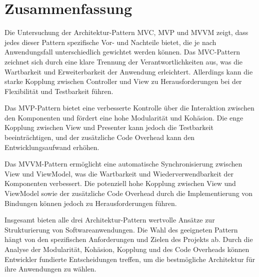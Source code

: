 
\chapter{Zusammenfassung}

Die Untersuchung der Architektur-Pattern \ac{MVC}, \ac{MVP} und \ac{MVVM} zeigt, dass jedes dieser Pattern spezifische Vor- und Nachteile bietet, die je nach Anwendungsfall unterschiedlich gewichtet werden können. Das \ac{MVC}-Pattern zeichnet sich durch eine klare Trennung der Verantwortlichkeiten aus, was die Wartbarkeit und Erweiterbarkeit der Anwendung erleichtert. Allerdings kann die starke Kopplung zwischen Controller und View zu Herausforderungen bei der Flexibilität und Testbarkeit führen.

Das \ac{MVP}-Pattern bietet eine verbesserte Kontrolle über die Interaktion zwischen den Komponenten und fördert eine hohe Modularität und Kohäsion. Die enge Kopplung zwischen View und Presenter kann jedoch die Testbarkeit beeinträchtigen, und der zusätzliche Code Overhead kann den Entwicklungsaufwand erhöhen.

Das \ac{MVVM}-Pattern ermöglicht eine automatische Synchronisierung zwischen View und ViewModel, was die Wartbarkeit und Wiederverwendbarkeit der Komponenten verbessert. Die potenziell hohe Kopplung zwischen View und ViewModel sowie der zusätzliche Code Overhead durch die Implementierung von Bindungen können jedoch zu Herausforderungen führen.

Insgesamt bieten alle drei Architektur-Pattern wertvolle Ansätze zur Strukturierung von Softwareanwendungen. Die Wahl des geeigneten Pattern hängt von den spezifischen Anforderungen und Zielen des Projekts ab. Durch die Analyse der Modularität, Kohäsion, Kopplung und des Code Overheads können Entwickler fundierte Entscheidungen treffen, um die bestmögliche Architektur für ihre Anwendungen zu wählen.
